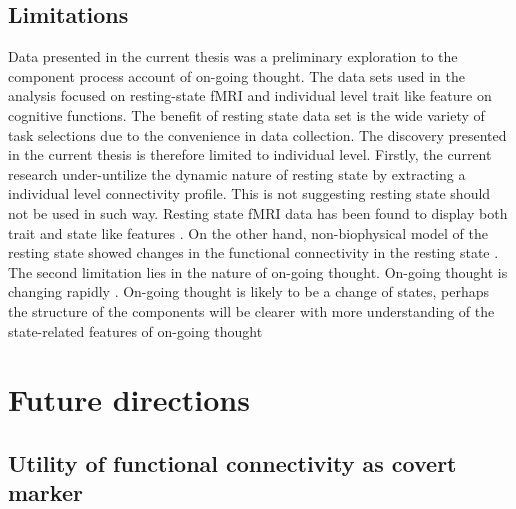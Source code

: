 \subsection{Limitations}
Data presented in the current thesis was a preliminary exploration to the component process account of on-going thought. The data sets used in the analysis focused on resting-state fMRI and individual level trait like feature on cognitive functions. The benefit of resting state data set is the wide variety of task selections due to the convenience in data collection. The discovery presented in the current thesis is therefore limited to individual level. Firstly, the current research under-untilize the dynamic nature of resting state by extracting a individual level connectivity profile. This is not suggesting resting state should not be used in such way. Resting state fMRI data has been found to display both trait and state like features \cite{Geerligs2015}. On the other hand, non-biophysical model of the resting state showed changes in the functional connectivity in the resting state \cite{Vidaurre2017}. The second limitation lies in the nature of on-going thought. On-going thought is changing rapidly \cite{KucyiNI2017}. On-going thought is likely to be a change of states, perhaps the structure of the components will be clearer with more understanding of the state-related features of on-going thought


\section{Future directions}
\label{ch:discussion:future}


\subsection{Utility of functional connectivity as covert marker}

%
%
%

